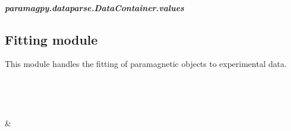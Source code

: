 \documentclass[a4paper,10pt,english,openany,oneside]{sphinxmanual}
\begin{document}
\begin{fulllineitems}
\begin{fulllineitems}
\begin{fulllineitems}
\end{fulllineitems}



\subparagraph{paramagpy.dataparse.DataContainer.values}
\label{\detokenize{reference/generated/paramagpy.dataparse.DataContainer.values:paramagpy-dataparse-datacontainer-values}}\label{\detokenize{reference/generated/paramagpy.dataparse.DataContainer.values::doc}}

\begin{fulllineitems}
\label{\detokenize{reference/generated/paramagpy.dataparse.DataContainer.values:paramagpy.dataparse.DataContainer.values}}
\end{fulllineitems}


\end{fulllineitems}


\end{fulllineitems}



\subsection{Fitting module}
\label{\detokenize{reference/index:fitting-module}}
\sphinxAtStartPar
This module handles the fitting of paramagnetic objects to experimental data.


\begin{savenotes}\sphinxatlongtablestart\begin{longtable}[c]{}
\hline

\endfirsthead

%
{}\\
\hline

\endhead

\hline
{}\\
\endfoot

\endlastfoot

\sphinxAtStartPar
{\hyperref[\detokenize{reference/generated/paramagpy.fit:module-paramagpy.fit}]{}}
&
\sphinxAtStartPar

\\
\hline
\end{longtable}\sphinxatlongtableend\end{savenotes}
\end{document}
